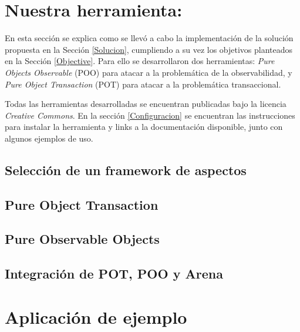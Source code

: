 \section{Nuestra herramienta: }
\label{Implementacion}

	En esta sección se explica como se llevó a cabo la implementación de la solución
	propuesta en la Sección \ref{Solucion}, cumpliendo a su vez los objetivos
	planteados en la Sección \ref{Objective}. Para ello se desarrollaron dos
	herramientas:
	\emph{Pure Objects Observable} (POO) para atacar a la problemática de la
	observabilidad, y \emph{Pure Object Transaction} (POT) para atacar a la
	problemática transaccional.

	Todas las herramientas desarrolladas se encuentran publicadas bajo la licencia \emph{Creative Commons}.
	En la sección \ref{Configuracion} se encuentran las instrucciones para instalar la herramienta y 
	links a la documentación disponible, junto con algunos ejemplos de uso.
	
\subsection{Selección de un framework de aspectos}
	
	
\subsection{Pure Object Transaction}
	\label{pot} 
	
	
\subsection{Pure Observable Objects}
	\label{poo}
	
	
\subsection{Integración de POT, POO y Arena}
	
	
\section{Aplicación de ejemplo}
	\label{Example}	
	